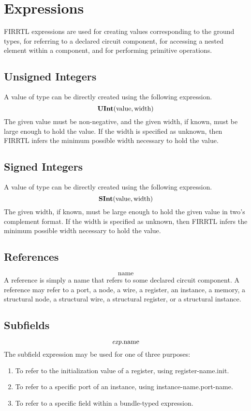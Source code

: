 \documentclass[12pt]{article}
\begin{document}
\section{Expressions}

FIRRTL expressions are used for creating values corresponding to the ground types, for referring to a declared circuit component, for accessing a nested element within a component, and for performing primitive operations. 

\subsection{Unsigned Integers}

A value of type  can be directly created using the following expression.
\[
\text{\bf UInt}(\text{value}, \text{width})
\]
The given value must be non-negative, and the given width, if known, must be large enough to hold the value.
If the width is specified as unknown, then FIRRTL infers the minimum possible width necessary to hold the value.

\subsection{Signed Integers}

A value of type  can be directly created using the following expression.
\[
\text{\bf SInt}(\text{value}, \text{width})
\]
The given width, if known, must be large enough to hold the given value in two's complement format.
If the width is specified as unknown, then FIRRTL infers the minimum possible width necessary to hold the value.

\subsection{References}
\[
\text{name}
\]
A reference is simply a name that refers to some declared circuit component.
A reference may refer to a port, a node, a wire, a register, an instance, a memory, a structural node, a structural wire, a structural register, or a structural instance.

\subsection{Subfields}
\[
\text{\em exp}.\text{name}
\]
The subfield expression may be used for one of three purposes:
\begin{enumerate}
\item To refer to the initialization value of a register, using register-name.init.
\item To refer to a specific port of an instance, using instance-name.port-name. 
\item To refer to a specific field within a bundle-typed expression.
\end{enumerate}
\end{document}

